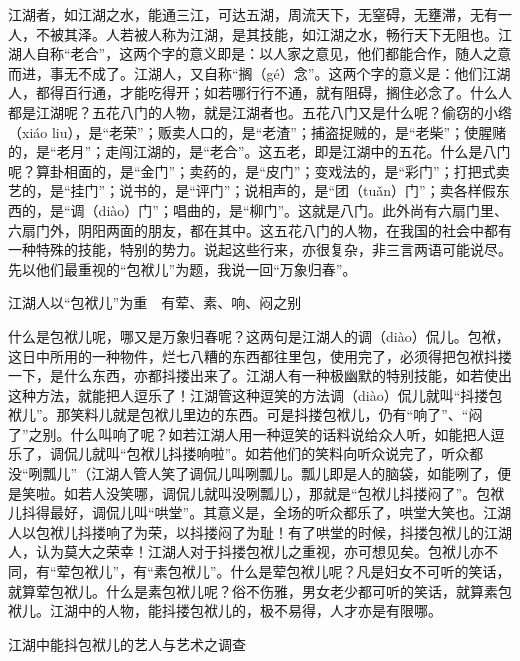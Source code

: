 \documentclass[12pt,UTF8]{ctexbook}
\begin{document}
江湖者，如江湖之水，能通三江，可达五湖，周流天下，无窒碍，无壅滞，无有一人，不被其泽。人若被人称为江湖，是其技能，如江湖之水，畅行天下无阻也。江湖人自称“老合”，这两个字的意义即是：以人家之意见，他们都能合作，随人之意而进，事无不成了。江湖人，又自称“搁（gé）念”。这两个字的意义是：他们江湖人，都得百行通，才能吃得开；如若哪行行不通，就有阻碍，搁住必念了。什么人都是江湖呢？五花八门的人物，就是江湖者也。五花八门又是什么呢？偷窃的小绺（xiáo liu），是“老荣”；贩卖人口的，是“老渣”；捕盗捉贼的，是“老柴”；使腥赌的，是“老月”；走闯江湖的，是“老合”。这五老，即是江湖中的五花。什么是八门呢？算卦相面的，是“金门”；卖药的，是“皮门”；变戏法的，是“彩门”；打把式卖艺的，是“挂门”；说书的，是“评门”；说相声的，是“团（tuǎn）门”；卖各样假东西的，是“调（diào）门”；唱曲的，是“柳门”。这就是八门。此外尚有六扇门里、六扇门外，阴阳两面的朋友，都在其中。这五花八门的人物，在我国的社会中都有一种特殊的技能，特别的势力。说起这些行来，亦很复杂，非三言两语可能说尽。先以他们最重视的“包袱儿”为题，我说一回“万象归春”。





江湖人以“包袱儿”为重　有荤、素、响、闷之别


什么是包袱儿呢，哪又是万象归春呢？这两句是江湖人的调（diào）侃儿。包袱，这日中所用的一种物件，烂七八糟的东西都往里包，使用完了，必须得把包袱抖搂一下，是什么东西，亦都抖搂出来了。江湖人有一种极幽默的特别技能，如若使出这种方法，就能把人逗乐了！江湖管这种逗笑的方法调（diào）侃儿就叫“抖搂包袱儿”。那笑料儿就是包袱儿里边的东西。可是抖搂包袱儿，仍有“响了”、“闷了”之别。什么叫响了呢？如若江湖人用一种逗笑的话料说给众人听，如能把人逗乐了，调侃儿就叫“包袱儿抖搂响啦”。如若他们的笑料向听众说完了，听众都没“咧瓢儿”（江湖人管人笑了调侃儿叫咧瓢儿。瓢儿即是人的脑袋，如能咧了，便是笑啦。如若人没笑哪，调侃儿就叫没咧瓢儿），那就是“包袱儿抖搂闷了”。包袱儿抖得最好，调侃儿叫“哄堂”。其意义是，全场的听众都乐了，哄堂大笑也。江湖人以包袱儿抖搂响了为荣，以抖搂闷了为耻！有了哄堂的时候，抖搂包袱儿的江湖人，认为莫大之荣幸！江湖人对于抖搂包袱儿之重视，亦可想见矣。包袱儿亦不同，有“荤包袱儿”，有“素包袱儿”。什么是荤包袱儿呢？凡是妇女不可听的笑话，就算荤包袱儿。什么是素包袱儿呢？俗不伤雅，男女老少都可听的笑话，就算素包袱儿。江湖中的人物，能抖搂包袱儿的，极不易得，人才亦是有限哪。





江湖中能抖包袱儿的艺人与艺术之调查
\end{document}
